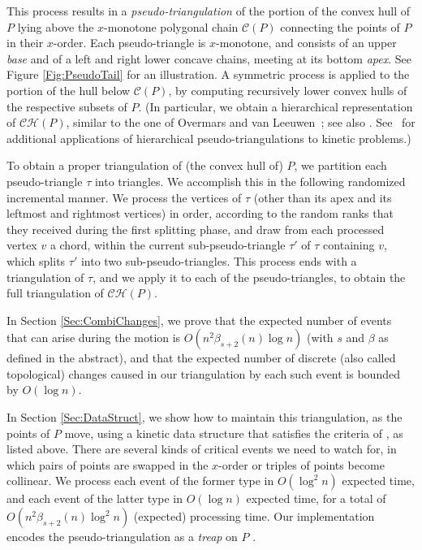\documentclass[11pt]{article}
\def\CH{{\mathcal{CH}}}
\def\C{\mathcal{C}}
\begin{document}
This process results in a {\em pseudo-triangulation} of the portion 
of the convex hull of $P$ lying above the $x$-monotone polygonal chain $\C(P)$ 
connecting the points of $P$ in their $x$-order. Each pseudo-triangle is
$x$-monotone, and consists of an upper {\em base} and of a left and
right lower concave chains, meeting at its bottom {\em apex}. See
Figure \ref{Fig:PseudoTail} for an illustration.
A symmetric process is applied to the portion of the hull below 
$\C(P)$, by computing recursively lower convex hulls of the
respective subsets of $P$.
(In particular, we obtain a hierarchical representation of $\CH(P)$, similar to the one of Overmars and van
Leeuwen~\cite{Overmars}; see also \cite{AKS}. See~\cite{ABG,TwoPolyg04,Speckmann} for additional applications of hierarchical pseudo-triangulations to kinetic problems.)

To obtain a proper triangulation of (the convex hull of) $P$, we partition each
pseudo-triangle $\tau$ into triangles. 
We accomplish this in the
following randomized incremental manner. We process the vertices
of $\tau$ (other than its apex and its leftmost and rightmost 
vertices) in order, according to the random ranks that they received
during the first splitting phase, and draw from each processed
vertex $v$ a chord, within the current sub-pseudo-triangle $\tau'$
of $\tau$ containing $v$, which splits $\tau'$ into two
sub-pseudo-triangles. This process ends with a triangulation of 
$\tau$, and we apply it to each of the pseudo-triangles, to obtain the full triangulation of $\CH(P)$.

In Section \ref{Sec:CombiChanges}, we prove that the expected number of events that
can arise during the motion is $O(n^2\beta_{s+2}(n)\log n)$ (with $s$ and $\beta$ as defined in the abstract), and that the expected number of discrete (also called topological) changes caused in our triangulation by each such event is bounded by $O(\log n)$.


In Section \ref{Sec:DataStruct}, we show how to maintain this triangulation, as the points 
of $P$ move, using a kinetic data structure that satisfies the criteria of \cite{BG99}, as listed above. 
There are several kinds of critical events we need to
watch for, in which pairs of points are swapped in the $x$-order or
triples of points become collinear.
We process each event of the former type in $O(\log^2n)$ expected time, and each event of the latter type in $O(\log n)$ expected time, for a total of $O(n^2\beta_{s+2}(n)\log^2n)$ (expected) processing time.
Our implementation encodes the pseudo-triangulation as a \textit{treap} on $P$ \cite{SA96}. 
\end{document}
